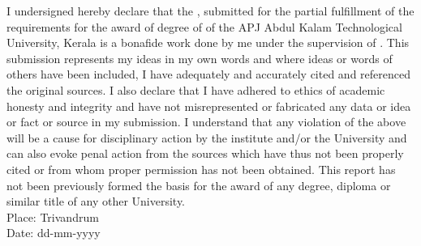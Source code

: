 
I undersigned hereby declare that the \reportnames{} \projectname{} 
, submitted for the partial fulfillment of the requirements for the award of degree of \degree{} of the APJ Abdul Kalam Technological University, Kerala is a bonafide work done by me under the supervision of \guide{}. This submission represents my ideas in my own words and where ideas or words of others have been included, I have adequately and accurately cited and referenced the original sources. I also declare that I have adhered to ethics of academic honesty and integrity and have not misrepresented or fabricated any data or idea or fact or source in my submission. I understand that any violation of the above will be a cause for disciplinary action by the institute and/or the University and can also evoke penal action from the sources which have thus not been properly cited or from whom proper permission has not been obtained. This report has not been previously formed the basis for the award of any degree, diploma or similar title of any other University. 
\vspace{20mm}
\\Place: Trivandrum								
\\Date: dd-mm-yyyy     \hfill     \stud{} 
